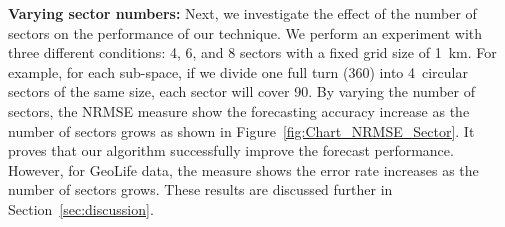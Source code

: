 \textbf{Varying sector numbers:} Next, we investigate the effect of the number of sectors on the performance of our technique.
We perform an experiment with three different conditions: 4, 6, and 8 sectors with a fixed grid size of 1~km.
For example, for each sub-space, if we divide one full turn (360\degree) into 4~circular sectors of the same size, each sector will cover 90\degree.
By varying the number of sectors, the NRMSE measure show the forecasting accuracy increase as the number of sectors grows as shown in Figure~\ref{fig:Chart_NRMSE_Sector}.
It proves that our algorithm successfully improve the forecast performance.
However, for GeoLife data, the measure shows the error rate increases as the number of sectors grows.
These results are discussed further in Section~\ref{sec:discussion}.




